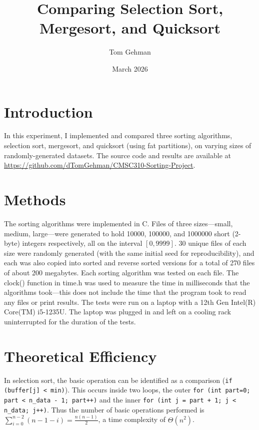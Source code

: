 \documentclass{article}
\title{Comparing Selection Sort, Mergesort, and Quicksort}
\author{Tom Gehman}
\date{March 2026}
\begin{document}
\maketitle

\section{Introduction}

In this experiment, I implemented and compared three sorting algorithms, selection sort, mergesort, and quicksort (using fat partitions), on varying sizes of randomly-generated datasets.   The source code and results are available at \newline\href{https://github.com/dTomGehman/CMSC310-Sorting-Project}{https://github.com/dTomGehman/CMSC310-Sorting-Project}.  

\section{Methods}
The sorting algorithms were implemented in C.  Files of three sizes---small, medium, large---were generated to hold 10000, 100000, and 1000000 short (2-byte) integers respectively, all on the interval $[0,9999]$.  30 unique files of each size were randomly generated (with the same initial seed for reproducibility), and each was also copied into sorted and reverse sorted versions for a total of 270 files of about 200 megabytes.  Each sorting algorithm was tested on each file.  The clock() function in time.h was used to measure the time in milliseconds that the algorithms took---this does not include the time that the program took to read any files or print results.  The tests were run on a laptop with a 12th Gen Intel(R) Core(TM) i5-1235U.  The laptop was plugged in and left on a cooling rack uninterrupted for the duration of the tests.  

\section{Theoretical Efficiency}

In selection sort, the basic operation can be identified as a comparison (\texttt{if (buffer[j] < min)}). This occurs inside two loops, the outer \texttt{for (int part=0; part < n\_data - 1; part++)} and the inner \texttt{for (int j = part + 1; j < n\_data; j++)}.  Thus the number of basic operations performed is $\sum_{i=0}^{n-2} (n-1-i) = \frac{n(n-1)}{2}$, a time complexity of $\Theta(n^2)$.  
\end{document}
